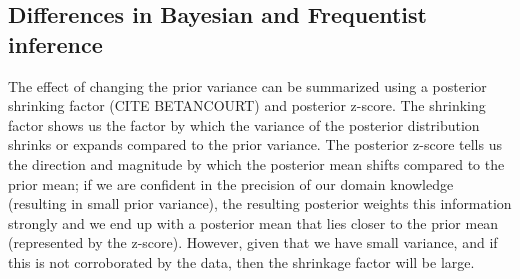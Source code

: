 \documentclass[]{article}
\begin{document}
\subsection{Differences in Bayesian and Frequentist
inference}\label{differences-in-bayesian-and-frequentist-inference}

The effect of changing the prior variance can be summarized using a
posterior shrinking factor (CITE BETANCOURT) and posterior z-score. The
shrinking factor shows us the factor by which the variance of the
posterior distribution shrinks or expands compared to the prior
variance. The posterior z-score tells us the direction and magnitude by
which the posterior mean shifts compared to the prior mean; if we are
confident in the precision of our domain knowledge (resulting in small
prior variance), the resulting posterior weights this information
strongly and we end up with a posterior mean that lies closer to the
prior mean (represented by the z-score). However, given that we have
small variance, and if this is not corroborated by the data, then the
shrinkage factor will be large.
\end{document}
